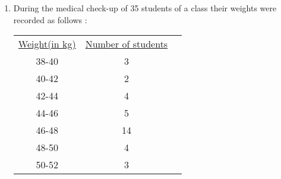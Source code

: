 \documentclass[journal,12pt,twocolumn]{IEEEtran}
\begin{document}
\begin{enumerate}
[Take $\pi$ = $\frac{22}{7}$] \\
\item  During the medical check-up of 35 students of a class their weights were recorded as follows :
\begin{center}
        \begin{tabular}{ c c c }
            \underline{Weight(in kg)} & \underline{Number of students}  \\
            38-40 & 3  \\
            40-42 & 2  \\
            42-44 & 4  \\
            44-46 & 5  \\
            46-48 & 14 \\
            48-50 & 4  \\
            50-52 & 3  \\
        \end{tabular}
    \end{center}
\end{enumerate}
\end{document}
